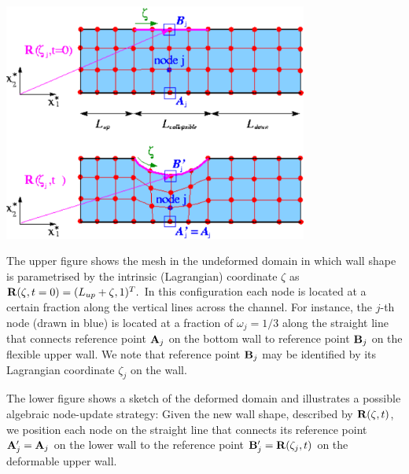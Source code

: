  
\begin{DoxyImage}
\includegraphics[width=0.75\textwidth]{alg_node_update_sketch}
\end{DoxyImage}


The upper figure shows the mesh in the undeformed domain in which wall shape is parametrised by the intrinsic (Lagrangian) coordinate $ \zeta $ as $ {\bf R}(\zeta,t=0) = (L_{up} + \zeta, 1) ^T. $ In this configuration each node is located at a certain fraction along the vertical lines across the channel. For instance, the $ j$-\/th node (drawn in blue) is located at a fraction of $ \omega_j = 1/3 $ along the straight line that connects reference point $ {\bf A}_j $ on the bottom wall to reference point $ {\bf B}_j $ on the flexible upper wall. We note that reference point $ {\bf B}_j $ may be identified by its Lagrangian coordinate $ \zeta_j $ on the wall.

The lower figure shows a sketch of the deformed domain and illustrates a possible algebraic node-\/update strategy\+: Given the new wall shape, described by $ {\bf R}(\zeta,t) $, we position each node on the straight line that connects its reference point $ {\bf A}'_j = {\bf A}_j $ on the lower wall to the reference point $ {\bf B}'_j = {\bf R}(\zeta_j,t) $ on the deformable upper wall.

